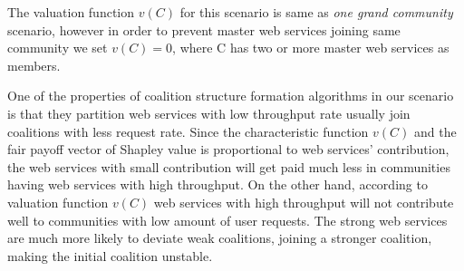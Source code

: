 \documentclass[10pt, conference, compsocconf]{IEEEtran}
\theoremstyle{plain}
\theoremstyle{definition}
\begin{document}
The valuation function $v(C)$ for this scenario is same as \emph{one grand community} scenario, however in order to prevent master web services joining same community we set $v(C) = 0$, where C has two or more master web services as members. 

One of the properties of coalition structure formation algorithms in our scenario is that they partition web services with low throughput rate usually join coalitions with less request rate. Since the characteristic function $v(C)$ and  the fair payoff vector of Shapley value is proportional to web services' contribution, the web services with small contribution will get paid much less in communities having web services with high throughput. On the other hand, according to valuation function $v(C)$ web services with high throughput will not contribute well to communities with low amount of user requests. The strong web services are much more likely to deviate weak coalitions, joining a stronger coalition, making the initial coalition unstable.
\end{document}
